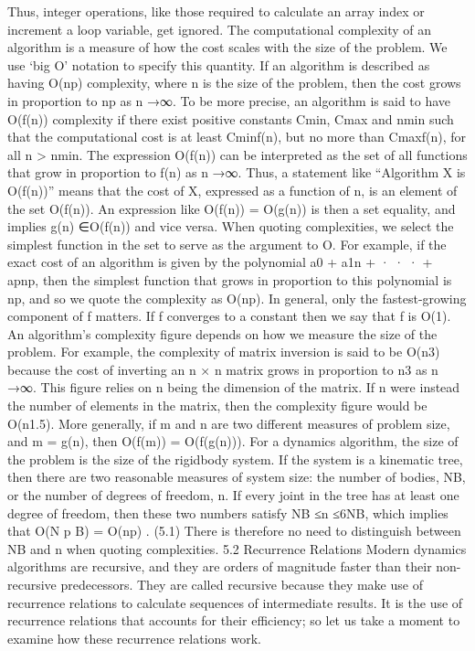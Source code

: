 Thus, integer operations, like those required to calculate an array index or increment a loop variable, get ignored. The computational complexity of an algorithm is a measure of how the cost scales with the size of the problem. We use ‘big O’ notation to specify this quantity. If an algorithm is described as having O(np) complexity, where n is the size of the problem, then the cost grows in proportion to np as n →∞. To be more precise, an algorithm is said to have O(f(n)) complexity if there exist positive constants Cmin, Cmax and nmin such that the computational cost is at least Cminf(n), but no more than Cmaxf(n), for all n > nmin. The expression O(f(n)) can be interpreted as the set of all functions that grow in proportion to f(n) as n →∞. Thus, a statement like “Algorithm X is O(f(n))” means that the cost of X, expressed as a function of n, is an element of the set O(f(n)). An expression like O(f(n)) = O(g(n)) is then a set equality, and implies g(n) ∈O(f(n)) and vice versa. When quoting complexities, we select the simplest function in the set to serve as the argument to O. For example, if the exact cost of an algorithm is given by the polynomial a0 + a1n + · · · + apnp, then the simplest function that grows in proportion to this polynomial is np, and so we quote the complexity as O(np). In general, only the fastest-growing component of f matters. If f converges to a constant then we say that f is O(1). An algorithm’s complexity figure depends on how we measure the size of the problem. For example, the complexity of matrix inversion is said to be O(n3) because the cost of inverting an n × n matrix grows in proportion to n3 as n →∞. This figure relies on n being the dimension of the matrix. If n were instead the number of elements in the matrix, then the complexity figure would be O(n1.5). More generally, if m and n are two different measures of problem size, and m = g(n), then O(f(m)) = O(f(g(n))). For a dynamics algorithm, the size of the problem is the size of the rigidbody system. If the system is a kinematic tree, then there are two reasonable measures of system size: the number of bodies, NB, or the number of degrees of freedom, n. If every joint in the tree has at least one degree of freedom, then these two numbers satisfy NB ≤n ≤6NB, which implies that O(N p B) = O(np) . (5.1) There is therefore no need to distinguish between NB and n when quoting complexities. 5.2 Recurrence Relations Modern dynamics algorithms are recursive, and they are orders of magnitude faster than their non-recursive predecessors. They are called recursive because they make use of recurrence relations to calculate sequences of intermediate results. It is the use of recurrence relations that accounts for their efficiency; so let us take a moment to examine how these recurrence relations work.

